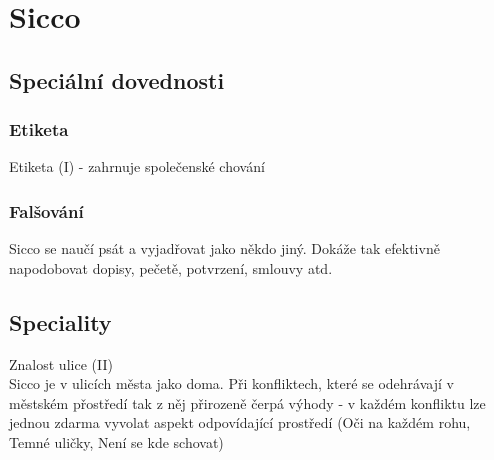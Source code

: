 \section{Sicco}
\label{sec:sicco}

\subsection{Speciální dovednosti}
\label{sec:sicco-dovednosti}

\subsubsection{Etiketa}
\label{sec:sicco-etiketa}
Etiketa (I) - zahrnuje společenské chování\\

\subsubsection{Falšování}
\label{sec:sicco-falsovani}
Sicco se naučí psát a vyjadřovat jako někdo jiný. Dokáže tak efektivně napodobovat dopisy, pečetě, potvrzení, smlouvy atd. \\

\begin{akce}
\end{akce}


\subsection{Speciality}
\label{sec:sicco-speciality}

Znalost ulice (II)\\
Sicco je v ulicích města jako doma. Při konfliktech, které se odehrávají v městském přostředí tak z něj přirozeně čerpá výhody - v každém konfliktu lze jednou zdarma vyvolat aspekt odpovídající prostředí (Oči na každém rohu, Temné uličky, Není se kde schovat)\\

